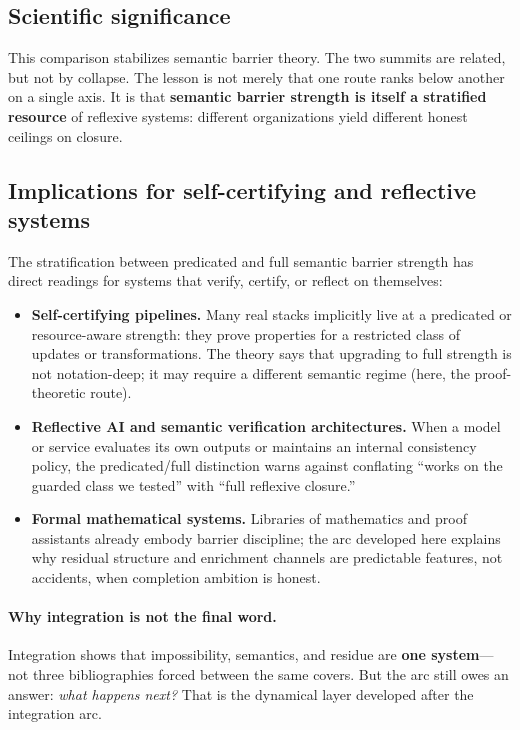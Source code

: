 \documentclass[11pt]{article}
\theoremstyle{plain}
\theoremstyle{definition}
\theoremstyle{remark}
\begin{document}
\subsection{Scientific significance}

This comparison stabilizes semantic barrier theory. The two summits are related, but not by collapse. The lesson is not merely that one route ranks below another on a single axis. It is that \textbf{semantic barrier strength is itself a stratified resource} of reflexive systems: different organizations yield different honest ceilings on closure.

\subsection{Implications for self-certifying and reflective systems}

The stratification between predicated and full semantic barrier strength has direct readings for systems that verify, certify, or reflect on themselves:
\begin{itemize}[leftmargin=1.5em]
\item \textbf{Self-certifying pipelines.} Many real stacks implicitly live at a predicated or resource-aware strength: they prove properties for a restricted class of updates or transformations. The theory says that upgrading to full strength is not notation-deep; it may require a different semantic regime (here, the proof-theoretic route).
\item \textbf{Reflective AI and semantic verification architectures.} When a model or service evaluates its own outputs or maintains an internal consistency policy, the predicated/full distinction warns against conflating ``works on the guarded class we tested'' with ``full reflexive closure.''
\item \textbf{Formal mathematical systems.} Libraries of mathematics and proof assistants already embody barrier discipline; the arc developed here explains why residual structure and enrichment channels are predictable features, not accidents, when completion ambition is honest.
\end{itemize}

\paragraph{Why integration is not the final word.}
Integration shows that impossibility, semantics, and residue are \textbf{one system}---not three bibliographies forced between the same covers. But the arc still owes an answer: \emph{what happens next?} That is the dynamical layer developed after the integration arc.
\end{document}
